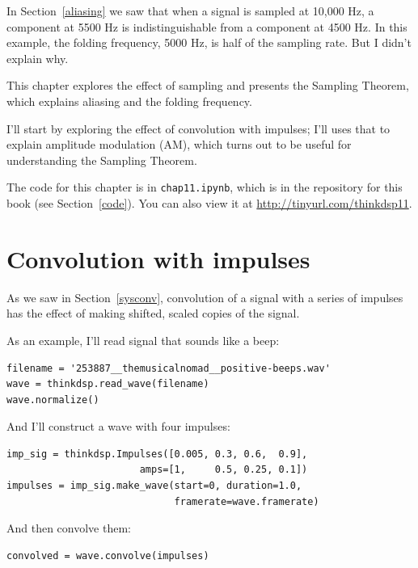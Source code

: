 \documentclass[12pt]{book}
\begin{document}
In Section~\ref{aliasing} we saw that when a signal is sampled at
10,000 Hz, a component at 5500 Hz is indistinguishable from a
component at 4500 Hz.  In this example, the folding frequency, 5000 Hz,
is half of the sampling rate.  But I didn't explain why.

This chapter explores the effect of sampling and presents the
Sampling Theorem, which explains aliasing and the folding frequency.

I'll start by exploring the effect of convolution with impulses;
I'll uses that to explain amplitude modulation (AM), which
turns out to be useful for understanding the Sampling Theorem.

The code for this chapter is in {\tt chap11.ipynb}, which is in the
repository for this book (see Section~\ref{code}).
You can also view it at \url{http://tinyurl.com/thinkdsp11}.


\section{Convolution with impulses}

As we saw in Section~\ref{sysconv}, convolution of a signal with
a series of impulses has the effect of making shifted, scaled
copies of the signal.

As an example, I'll read signal that sounds like a beep:

\begin{verbatim}
filename = '253887__themusicalnomad__positive-beeps.wav'
wave = thinkdsp.read_wave(filename)
wave.normalize()
\end{verbatim}

And I'll construct a wave with four impulses:

\begin{verbatim}
imp_sig = thinkdsp.Impulses([0.005, 0.3, 0.6,  0.9], 
                       amps=[1,     0.5, 0.25, 0.1])
impulses = imp_sig.make_wave(start=0, duration=1.0, 
                             framerate=wave.framerate)
\end{verbatim}

And then convolve them:

\begin{verbatim}
convolved = wave.convolve(impulses)
\end{verbatim}
\end{document}
